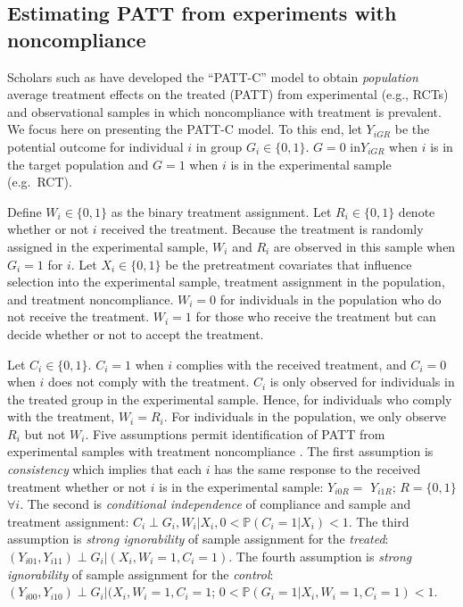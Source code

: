\subsection{Estimating PATT from experiments with noncompliance}\label{estimating-patt-from-experiments-with-noncompliance}

Scholars such as \citet{ottoboni2020PATT} have developed the ``PATT-C'' model
to obtain \emph{population} average treatment effects on the treated (PATT)
from experimental (e.g., RCTs) and observational samples in which
noncompliance with treatment is prevalent. We focus here on presenting
the PATT-C model. To this end, let \(Y_{iGR}\) be the potential outcome
for individual \(i\) in group \(G_{i}\in\{0,1\}.\) \(G=0\) in\(Y_{iGR}\) when
\(i\) is in the target population and \(G=1\) when \(i\) is in the
experimental sample (e.g.~RCT).

Define \(W_{i}\in\{0,1\}\) as the binary treatment assignment. Let
\(R_{i}\in\{0,1\}\) denote whether or not \(i\) received the treatment.
Because the treatment is randomly assigned in the experimental sample,
\(W_{i}\) and \(R_{i}\) are observed in this sample when \(G_{i}=1\) for \(i\).
Let \(X_{i}\in\{0,1\}\) be the pretreatment covariates that influence
selection into the experimental sample, treatment assignment in the
population, and treatment noncompliance. \(W_{i}=0\) for individuals in
the population who do not receive the treatment. \(W_{i}=1\) for those who
receive the treatment but can decide whether or not to accept the
treatment.

Let \(C_{i}\in\{0,1\}\). \(C_{i}=1\) when \(i\) complies with the received
treatment, and \(C_{i}=0\) when \(i\) does not comply with the treatment.
\(C_{i}\) is only observed for individuals in the treated group in the
experimental sample. Hence, for individuals who comply with the
treatment, \(W_{i}=R_{i}\). For individuals in the population, we only
observe \(R_{i}\) but not \(W_{i}\). Five assumptions permit identification
of PATT from experimental samples with treatment noncompliance
\citep[ 110]{ottoboni2020PATT}. The first assumption is \emph{consistency} which
implies that each \(i\) has the same response to the received treatment
whether or not \(i\) is in the experimental sample: \(Y_{i0R}=\) \(Y_{i1R}\);
\(R=\{0,1\}\) \(\forall i.\) The second is \emph{conditional independence} of
compliance and sample and treatment assignment:
\(C_{i}\perp G_{i},W_{i}|X_{i}, 0<\mathbb{P}(C_{i}=1|X_{i})<1\). The third
assumption is \emph{strong ignorability} of sample assignment for the
\emph{treated}: \((Y_{i01},Y_{i11})\perp G_{i}|(X_{i},W_{i}=1,C_{i}=1)\). The
fourth assumption is \emph{strong ignorability} of sample assignment for the
\emph{control}: \((Y_{i00},Y_{i10})\perp G_{i}|(X_{i},W_{i}=1,C_{i}=1\);
\(0<\mathbb{P}(G_{i}=1|X_{i},W_{i}=1,C_{i}=1)<1\).

